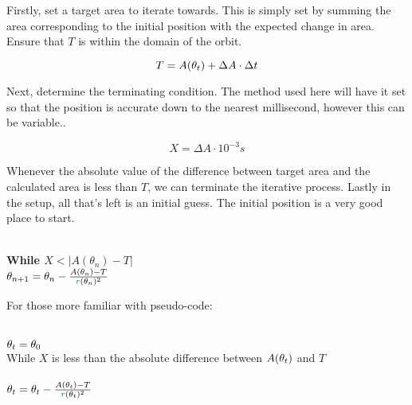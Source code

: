 Firstly, set a target area to iterate towards. This is simply set by summing the area corresponding to the initial position with the expected change in area. Ensure that $T$ is within the domain of the orbit.

$$T = A(\textcolor{black}{\theta_t}) + \Delta A \cdot \Delta t$$

Next, determine the terminating condition. The method used here will have it set so that the position is accurate down to the nearest millisecond, however this can be variable..

$$X = \Delta A \cdot 10^{-3}s$$

Whenever the absolute value of the difference between target area and the calculated area is less than $T$, we can terminate the iterative process. Lastly in the setup, all that's left is an initial guess. The initial position is a very good place to start.
\\\\
\begin{adjustwidth}{16em}{}
\textbf{While $X < |A(\theta_n)-T|$}\\[7.5pt]
\bigskip
\indent\indent $\theta_{n+1} = \theta_n - \frac{A(\theta_n)-T}{\textcolor{teal}{r}(\theta_n)^2}$

\end{adjustwidth}

\bigskip
\bigskip

For those more familiar with pseudo-code:
\\\\
\begin{adjustwidth}{8em}{}
$\textcolor{black}{\theta_t} = \theta_0$\\[7.5pt]
While $X$ is less than the absolute difference between $A(\textcolor{black}{\theta_t})$ and $T$\\[7.5pt]
\indent\indent{}\\[5pt]
\indent\indent $\textcolor{black}{\theta_t} = \textcolor{black}{\theta_t} - \frac{A(\textcolor{black}{\theta_t})-T}{\textcolor{teal}{r}(\textcolor{black}{\theta_t})^2}$ 

\end{adjustwidth}